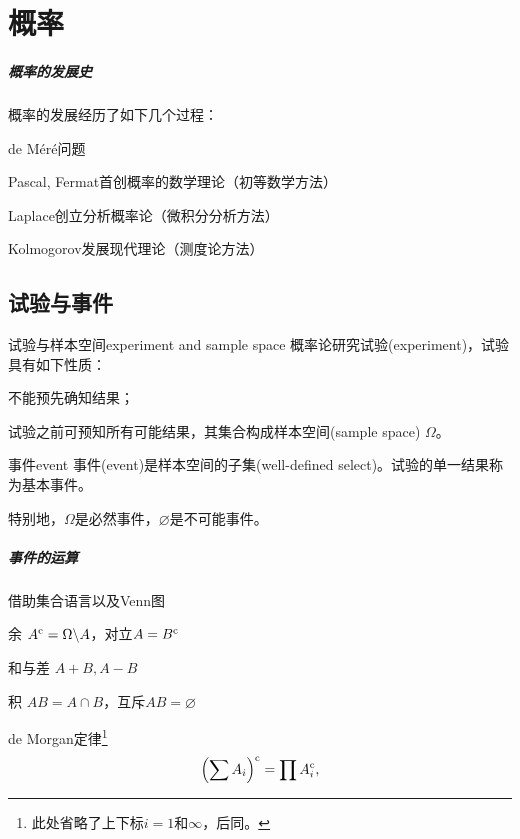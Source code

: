 	
\chapter{概率}
\paragraph{概率的发展史}
概率的发展经历了如下几个过程：
\begin{compactitem}
	\item de M\'er\'e问题
	\item Pascal, Fermat首创概率的数学理论（初等数学方法）
	\item Laplace创立分析概率论（微积分分析方法）
	\item Kolmogorov发展现代理论（测度论方法）
\end{compactitem}
\section{试验与事件}
\begin{definition}{试验与样本空间}{experiment and sample space}
    概率论研究试验(experiment)，试验具有如下性质：
    \begin{compactenum}
    	\item 不能预先确知结果；
    	\item 试验之前可预知所有可能结果，其集合构成样本空间(sample space) $\Omega$。
    \end{compactenum}
\end{definition}
\begin{definition}{事件}{event}
    事件(event)是样本空间的子集(well-defined select)。试验的单一结果称为基本事件。

    特别地，$\Omega$是必然事件，$\varnothing$是不可能事件。
\end{definition}

\paragraph{事件的运算}借助集合语言以及Venn图
\begin{compactitem}
	\item 余 $A^\mathrm{c} = \Omega\backslash A$，对立$A=B^\mathrm{c}$
	\item 和与差 $A+B, A-B$
	\item 积 $AB = A\cap B$，互斥$AB=\varnothing$
	\item de Morgan定律\footnote{此处省略了上下标$i=1$和$\infty$，后同。}
	\[
		\left(\sum A_i\right)^\mathrm{c} = \prod A_i^\mathrm{c},
	\]
\end{compactitem}

